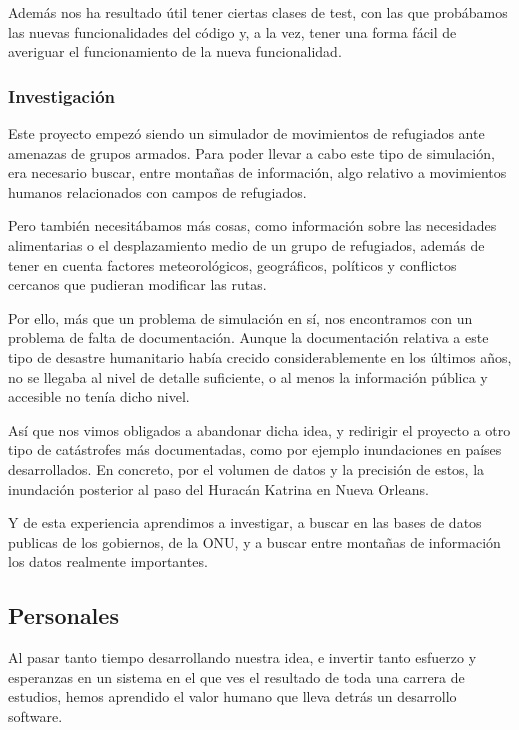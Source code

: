 Además nos ha resultado útil tener ciertas clases de test, con las que
probábamos las nuevas funcionalidades del código y, a la vez, tener una forma
fácil de averiguar el funcionamiento de la nueva funcionalidad.

\subsubsection*{Investigación}


Este proyecto empezó siendo un simulador de movimientos de refugiados ante
amenazas de grupos armados. Para poder llevar a cabo este tipo de simulación,
era necesario buscar, entre montañas de información, algo relativo a movimientos
humanos relacionados con campos de refugiados.

Pero también necesitábamos más cosas, como información sobre las necesidades
alimentarias o el desplazamiento medio de un grupo de refugiados, además de
tener en cuenta factores meteorológicos, geográficos, políticos y conflictos
cercanos que pudieran modificar las rutas.

Por ello, más que un problema de simulación en sí, nos encontramos con un
problema de falta de documentación. Aunque la documentación relativa a este tipo
de desastre humanitario había crecido considerablemente en los últimos años,
no se llegaba al nivel de detalle suficiente, o al menos la información pública
y accesible no tenía dicho nivel.

Así que nos vimos obligados a abandonar dicha idea, y redirigir el proyecto a
otro tipo de catástrofes más documentadas, como por ejemplo inundaciones en
países desarrollados. En concreto, por el volumen de datos y la precisión de
estos, la inundación posterior al paso del Huracán Katrina en Nueva Orleans.


Y de esta experiencia aprendimos a investigar, a buscar en las bases de datos
publicas de los gobiernos, de la ONU, y a buscar entre montañas de información
los datos realmente importantes.

\subsection*{Personales}

Al pasar tanto tiempo desarrollando nuestra idea, e invertir tanto esfuerzo y
esperanzas en un sistema en el que ves el resultado de toda una carrera de
estudios, hemos aprendido el valor humano que lleva detrás un desarrollo
software.

